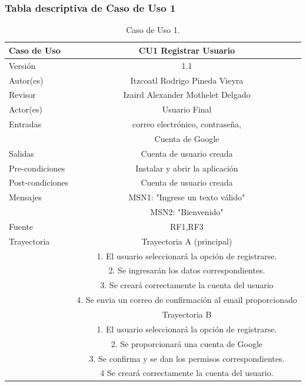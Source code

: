 \documentclass{article}
\begin{document}
\subsubsection{Tabla descriptiva de Caso de Uso 1}
\begin{table}[H]
\caption{Caso de Uso 1.}
\begin{tabular}{|M{5cm}|c|}

\hline
Caso de Uso & CU1 Registrar Usuario\\ \hline
Versión & 1.1\\ \hline
Autor(es) & Itzcoatl Rodrigo Pineda Vieyra\\ \hline
Revisor & Izaird Alexander Mothelet Delgado \\ \hline
Actor(es) & Usuario Final \\ \hline
Entradas & correo electrónico, contraseña, \\ & Cuenta de Google \\ \hline
Salidas & Cuenta de usuario creada \\ \hline
Pre-condiciones & Instalar y abrir la aplicación \\ \hline
Post-condiciones & Cuenta de usuario creada\\ \hline
Mensajes & MSN1: "Ingrese un texto válido"\\
		 & MSN2: "Bienvenido"\\ \hline
Fuente & RF1,RF3 \\ \hline	
	Trayectoria & Trayectoria A (principal)\\
		& 1.   El usuario seleccionará la opción de registrarse.\\
		& 2.   Se ingresarán los datos correspondientes.\\
		& 3.   Se creará correctamente la cuenta del usuario\\
		& 4.   Se envia un correo de confirmación al email proporcionado \\	
	& Trayectoria B\\
	& 1.   El usuario seleccionará la opción de registrarse.\\
	& 2.   Se proporcionará una cuenta de Google\\
	& 3.   Se confirma y se dan los permisos correspondientes.\\
	& 4   Se creará correctamente la cuenta del usuario.\\ \hline
\end{tabular}
\end{table}
\end{document}
